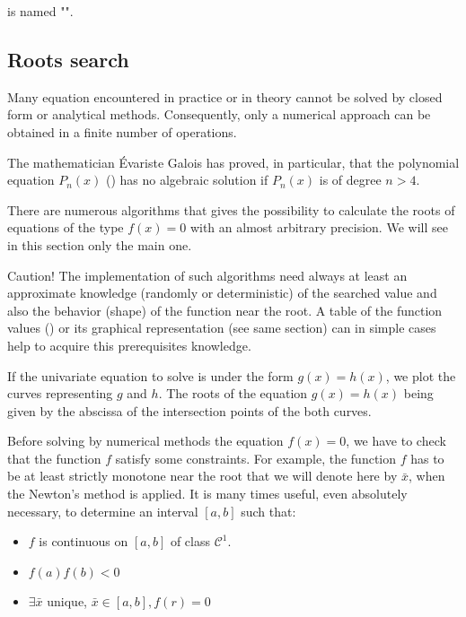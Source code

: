 	is named "".
	
	\subsection{Roots search}
	Many equation encountered in practice or in theory cannot be solved by closed form or analytical methods. Consequently, only a numerical approach can be obtained in a finite number of operations.

	The mathematician Évariste Galois has proved, in particular, that the polynomial equation $P_n(x)$ () has no algebraic solution if $P_n(x)$ is of degree $n>4$.

	There are numerous algorithms that gives the possibility to calculate the roots of equations of the type $f(x)=0$ with an almost arbitrary precision. We will see in this section only the main one.

	Caution! The implementation of such algorithms need always at least an approximate knowledge (randomly or deterministic) of the searched value and also the behavior (shape) of the function near the root. A table of the function values () or its graphical representation (see same section) can in simple cases help to acquire this prerequisites knowledge.
	
	If the univariate equation to solve is under the form $g(x)=h(x)$, we plot the curves representing $g$ and $h$. The roots of the equation $g(x)=h(x)$ being given by the abscissa of the intersection points of the both curves.
	
	\begin{tcolorbox}[title=Remark,colframe=black,arc=10pt]
	Before solving by numerical methods the equation $f(x)=0$, we have to check that the function $f$ satisfy some constraints. For example, the function $f$ has to be at least strictly monotone near the root that we will denote here by $\bar{x}$, when the Newton's method is applied. It is many times useful, even absolutely necessary, to determine an interval $[a,b]$ such that:
	\begin{itemize}
		\item $f$ is continuous on $[a,b]$ of class $\mathcal{C}^1$.

		\item $f(a)f(b)<0$
		
		\item $\exists \bar{x}$ unique, $\bar{x}\in [a,b],f(r)=0$
	\end{itemize}
	\end{tcolorbox}

